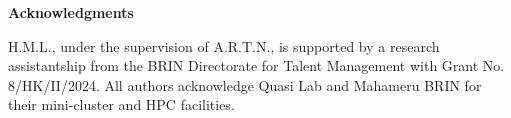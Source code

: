 \documentclass[5p, twocolumn, 10pt, sort&compress]{elsarticle}
\begin{document}
\medskip
\noindent\textbf{Acknowledgments}
\medskip

H.M.L., under the supervision of A.R.T.N., is supported by a research assistantship from the BRIN Directorate for Talent Management with
Grant No. 8/HK/II/2024.  All authors acknowledge Quasi Lab and Mahameru BRIN for their mini-cluster and HPC facilities. 




\end{document}
